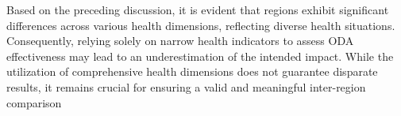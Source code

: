 


Based on the preceding discussion, it is evident that regions exhibit significant differences across various health dimensions, reflecting diverse health situations. Consequently, relying solely on narrow health indicators to assess ODA effectiveness may lead to an underestimation of the intended impact. While the utilization of comprehensive health dimensions does not guarantee disparate results, it remains crucial for ensuring a valid and meaningful inter-region comparison


